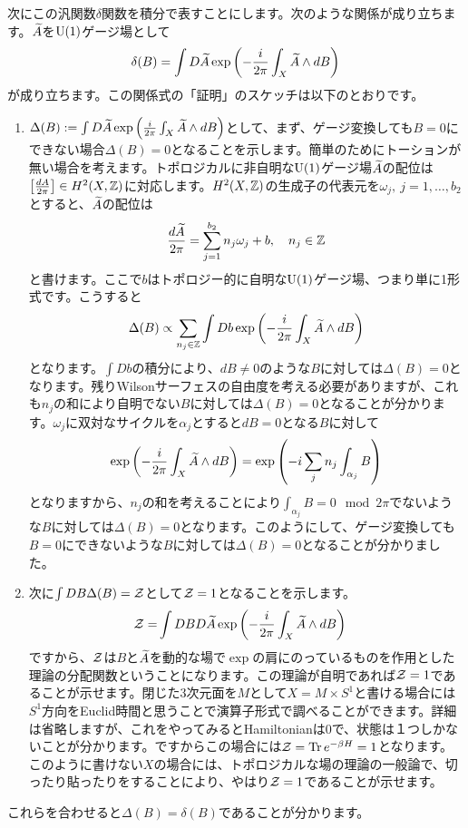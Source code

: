 \documentclass[generalized_symmetry.tex]{subfiles}
\begin{document}
次にこの汎関数$\delta$関数を積分で表すことにします。次のような関係が成り立ちます。$\widetilde{A}$を$\mbox{U}(1)$ゲージ場として
\begin{align}
  \delta(B) = \int D\widetilde{A} \exp\left(-\frac{i}{2\pi}\int_{X} \widetilde{A} \wedge dB\right)
  \label{integralBdelta}
\end{align}
が成り立ちます。この関係式の「証明」のスケッチは以下のとおりです。
\begin{enumerate}
  \item $\Delta(B):=\int D\widetilde{A} \exp\left(\frac{i}{2\pi}\int_{X} \widetilde{A} \wedge dB\right)$として、まず、ゲージ変換しても$B=0$にできない場合$\Delta(B)=0$となることを示します。簡単のためにトーションが無い場合を考えます。トポロジカルに非自明な$\mbox{U}(1)$ゲージ場$\widetilde{A}$の配位は$\left[\frac{dA}{2\pi}\right] \in H^2(X,\mathbb{Z})$に対応します。$H^2(X,\mathbb{Z})$の生成子の代表元を$\omega_j,\ j=1,\dots,b_2$とすると、$\widetilde{A}$の配位は
  \begin{align}
    \frac{d\widetilde{A}}{2\pi} = \sum_{j=1}^{b_2} n_j \omega_j + b,\quad n_j \in \mathbb{Z}
  \end{align}
  と書けます。ここで$b$はトポロジー的に自明な$\mbox{U}(1)$ゲージ場、つまり単に1形式です。こうすると
  \begin{align}
    \Delta(B) \propto \sum_{n_j \in \mathbb{Z}} \int Db \exp\left(-\frac{i}{2\pi}\int_{X} \widetilde{A} \wedge dB\right)
  \end{align}
  となります。$\int Db$の積分により、$dB\ne 0$のような$B$に対しては$\Delta(B)=0$となります。残りWilsonサーフェスの自由度を考える必要がありますが、これも$n_j$の和により自明でない$B$に対しては$\Delta(B)=0$となることが分かります。$\omega_j$に双対なサイクルを$\alpha_j$とすると$dB=0$となる$B$に対して
  \begin{align}
    \exp\left(-\frac{i}{2\pi}\int_{X} \widetilde{A} \wedge dB\right) = \exp\left(-i\sum_j n_j \int_{\alpha_j} B\right)
  \end{align}
  となりますから、$n_j$の和を考えることにより$\int_{\alpha_j} B =0 \mod 2\pi$でないような$B$に対しては$\Delta(B)=0$となります。このようにして、ゲージ変換しても$B=0$にできないような$B$に対しては$\Delta(B)=0$となることが分かりました。
  \item 次に$\int DB \Delta(B)=\mathcal{Z}$として$\mathcal{Z}=1$となることを示します。
  \begin{align}
    \mathcal{Z}=&\int DB D\widetilde{A} \exp\left(-\frac{i}{2\pi}\int_{X} \widetilde{A} \wedge dB\right)
    \label{trivialtheory}
  \end{align}
  ですから、$\mathcal{Z}$は$B$と$\widetilde{A}$を動的な場で$\exp$の肩にのっているものを作用とした理論の分配関数ということになります。この理論が自明であれば$\mathcal{Z}=1$であることが示せます。閉じた3次元面を$M$として$X=M \times S^1$と書ける場合には$S^1$方向をEuclid時間と思うことで演算子形式で調べることができます。詳細は省略しますが、これをやってみるとHamiltonianは$0$で、状態は１つしかないことが分かります。ですからこの場合には$\mathcal{Z}=\Tr e^{-\beta H}=1$となります。このように書けない$X$の場合には、トポロジカルな場の理論の一般論で、切ったり貼ったりをすることにより、やはり$\mathcal{Z}=1$であることが示せます。
\end{enumerate}
これらを合わせると$\Delta(B)=\delta(B)$であることが分かります。
\end{document}
